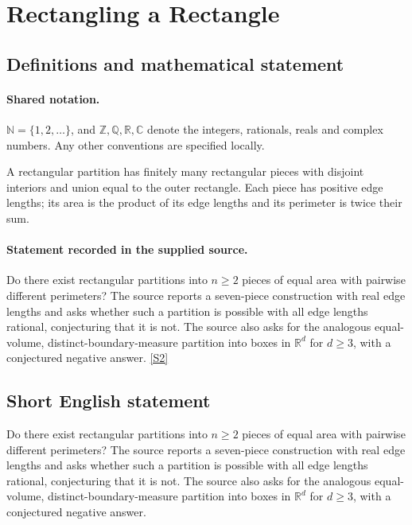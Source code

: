 \documentclass[11pt]{article}
\newcommand{\sref}[2]{\hyperlink{source:#1:#2}{[S#2]}}
\begin{document}
\section{Rectangling a Rectangle}\label{statement}

\subsection{Definitions and mathematical statement}

\paragraph{Shared notation.}$\mathbb N=\{1,2,\ldots\}$, and $\mathbb Z,\mathbb Q,\mathbb R,\mathbb C$ denote the integers, rationals, reals and complex numbers. Any other conventions are specified locally.


A rectangular partition has finitely many rectangular pieces with disjoint interiors and union equal to the outer rectangle. Each piece has positive edge lengths; its area is the product of its edge lengths and its perimeter is twice their sum.
\paragraph{Statement recorded in the supplied source.}
Do there exist rectangular partitions into $n\ge2$ pieces of equal area with pairwise different perimeters? The source reports a seven-piece construction with real edge lengths and asks whether such a partition is possible with all edge lengths rational, conjecturing that it is not. The source also asks for the analogous equal-volume, distinct-boundary-measure partition into boxes in $\mathbb R^d$ for $d\ge3$, with a conjectured negative answer. \sref{statement}{2}
\subsection{Short English statement}
Do there exist rectangular partitions into $n\ge2$ pieces of equal area with pairwise different perimeters? The source reports a seven-piece construction with real edge lengths and asks whether such a partition is possible with all edge lengths rational, conjecturing that it is not. The source also asks for the analogous equal-volume, distinct-boundary-measure partition into boxes in $\mathbb R^d$ for $d\ge3$, with a conjectured negative answer.
\end{document}
